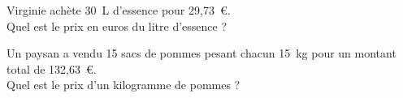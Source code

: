 \begin{myenumerate}
\item Virginie achète 30~L d'essence pour
29,73~\textgreek{\euro}.\\Quel est le prix en euros du litre d'essence
?
\item Un paysan a vendu 15 sacs de pommes pesant chacun 15~kg pour
un montant total de 132,63~\textgreek{\euro}.\\Quel est le prix d'un
kilogramme de pommes ?
\end{myenumerate}